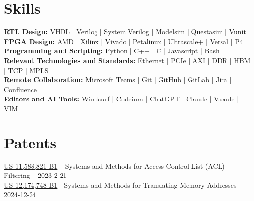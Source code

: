 \documentclass[10pt]{deedy-resume-reversed}
\begin{document}
\begin{minipage}[t]{1.0\textwidth}




\section{Skills}
\textbf{RTL Design:} VHDL | Verilog | System Verilog | Modelsim | Questasim | Vunit \\
\textbf{FPGA Design:} AMD | Xilinx | Vivado | Petalinux | Ultrascale+ | Versal | P4 \\
\textbf{Programming and Scripting:} Python | C++ | C | Javascript | Bash \\
\textbf{Relevant Technologies and Standards:} Ethernet | PCIe | AXI | DDR | HBM | TCP | MPLS \\
\textbf{Remote Collaboration:} Microsoft Teams | Git | GitHub | GitLab | Jira | Confluence \\
\textbf{Editors and AI Tools:} Windsurf | Codeium | ChatGPT | Claude | Vscode | VIM \\
\sectionsep


\section{Patents}
\href{https://image-ppubs.uspto.gov/dirsearch-public/print/downloadPdf/11588821}{US 11,588,821 B1}
– Systems and Methods for Access Control List (ACL) Filtering – 2023-2-21 \\
\href{https://image-ppubs.uspto.gov/dirsearch-public/print/downloadPdf/12174748}{US 12,174,748 B1}
- Systems and Methods for Translating Memory Addresses – 2024-12-24 \\
\sectionsep

\end{minipage}
\end{document}

